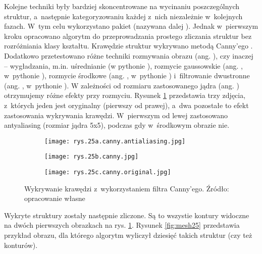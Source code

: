 Kolejne techniki były bardziej skoncentrowane na wycinaniu poszczególnych struktur, a~następnie kategoryzowaniu każdej z~nich niezależnie w~kolejnych fazach. W~tym celu wykorzystano pakiet  (nazywana dalej ). Jednak w~pierwszym kroku opracowano algorytm do przeprowadzania prostego zliczania struktur bez rozróżniania klasy kształtu. Krawędzie struktur wykrywano metodą Canny'ego \cite{Canny86}. Dodatkowo przetestowano różne techniki rozmywania obrazu (ang. ), czy inaczej – wygładzania, m.in. uśrednianie (w pythonie ), rozmycie gaussowskie (ang. , w~pythonie ), rozmycie środkowe (ang. , w~pythonie ) i~filtrowanie dwustronne (ang. , w~pythonie ). 
W zależności od rozmiaru zastosowanego jądra (ang. ) otrzymujemy różne efekty przy rozmyciu. Rysunek \ref{fig:mesh24} przedstawia trzy zdjęcia, z~których jeden jest oryginalny (pierwszy od prawej), a~dwa pozostałe to efekt zastosowania wykrywania krawędzi. W~pierwszym od lewej zastosowano antyaliasing (rozmiar jądra 5x5), podczas gdy w~środkowym obrazie nie.
\begin{figure}[h]
	\centering
	\begin{subfigure}{0.29\textwidth}
	    \centering
	    \texttt{[image: rys.25a.canny.antialiasing.jpg]} %
	\end{subfigure}
	\begin{subfigure}{0.29\textwidth}
	    \centering
	    \texttt{[image: rys.25b.canny.jpg]}
	\end{subfigure}
	\begin{subfigure}{0.29\textwidth}
	    \centering
	    \texttt{[image: rys.25c.canny.original.jpg]}
	\end{subfigure}
	\caption{\label{fig:mesh24}Wykrywanie krawędzi z~wykorzystaniem filtra Canny'ego. Źródło: opracowanie własne}
\end{figure}
Wykryte struktury zostały następnie zliczone. Są to wszystie kontury widoczne na dwóch pierwszych obrazkach na rys. \ref{fig:mesh24}. Rysunek \ref{fig:mesh25} przedstawia przykład obrazu, dla którego algorytm wyliczył dziesięć takich struktur (czy też konturów).
